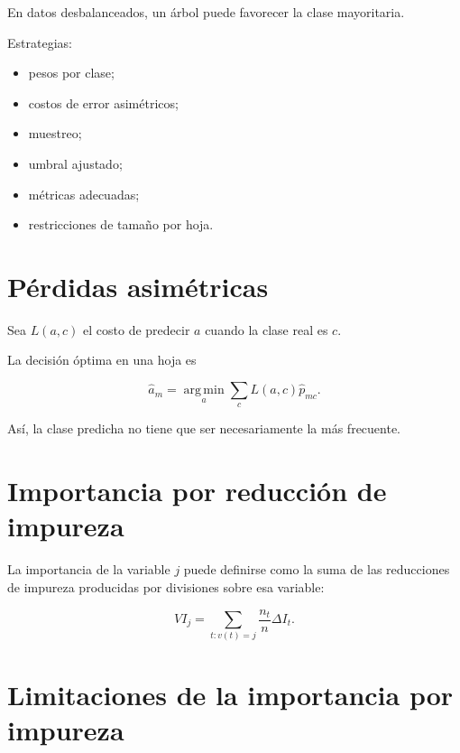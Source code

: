 \documentclass[
  spanish,
  10.5pt,
  letterpaper,
  DIV=11,
  numbers=noendperiod,
  oneside,
  open=any]{scrreprt}
\providecommand{\tightlist}{%
  \setlength{\itemsep}{0pt}\setlength{\parskip}{0pt}}
\theoremstyle{definition}
\theoremstyle{definition}
\theoremstyle{plain}
\theoremstyle{remark}
\begin{document}
En datos desbalanceados, un árbol puede favorecer la clase mayoritaria.

Estrategias:

\begin{itemize}
\tightlist
\item
  pesos por clase;
\item
  costos de error asimétricos;
\item
  muestreo;
\item
  umbral ajustado;
\item
  métricas adecuadas;
\item
  restricciones de tamaño por hoja.
\end{itemize}

\section*{Pérdidas asimétricas}\label{puxe9rdidas-asimuxe9tricas-1}


Sea \(L(a,c)\) el costo de predecir \(a\) cuando la clase real es \(c\).

La decisión óptima en una hoja es

\[
\widehat{a}_m
=
\operatorname*{arg\,min}_a
\sum_c
L(a,c)\widehat{p}_{mc}.
\]

Así, la clase predicha no tiene que ser necesariamente la más frecuente.

\section*{Importancia por reducción de
impureza}\label{importancia-por-reducciuxf3n-de-impureza}


La importancia de la variable \(j\) puede definirse como la suma de las
reducciones de impureza producidas por divisiones sobre esa variable:

\[
VI_j
=
\sum_{t:v(t)=j}
\frac{n_t}{n}
\Delta I_t.
\]

\section*{Limitaciones de la importancia por
impureza}\label{limitaciones-de-la-importancia-por-impureza}
\end{document}
